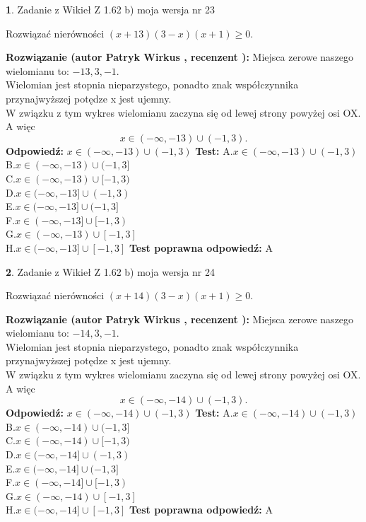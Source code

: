 \documentclass[12pt, a4paper]{article}
\theoremstyle{definition} %
\newtheorem{zad}{}
\newcommand{\zadStart}[1]{\begin{zad}#1\newline}
\newcommand{\zadStop}{\end{zad}}
\newcommand{\rozwStart}[2]{\noindent \textbf{Rozwiązanie (autor #1 , recenzent #2): }\newline}
\newcommand{\rozwStop}{\newline}
\newcommand{\odpStart}{\noindent \textbf{Odpowiedź:}\newline}
\newcommand{\odpStop}{\newline}
\newcommand{\testStart}{\noindent \textbf{Test:}\newline}
\newcommand{\testStop}{\newline}
\newcommand{\kluczStart}{\noindent \textbf{Test poprawna odpowiedź:}\newline}
\newcommand{\kluczStop}{\newline}
\begin{document}
\zadStart{Zadanie z Wikieł Z 1.62 b) moja wersja nr 23}

Rozwiązać nierówności $(x+13)(3-x)(x+1)\ge0$.
\zadStop
\rozwStart{Patryk Wirkus}{}
Miejsca zerowe naszego wielomianu to: $-13, 3, -1$.\\
Wielomian jest stopnia nieparzystego, ponadto znak współczynnika przy\linebreak najwyższej potędze x jest ujemny.\\ W związku z tym wykres wielomianu zaczyna się od lewej strony powyżej osi OX. A więc $$x \in (-\infty,-13) \cup (-1,3).$$
\rozwStop
\odpStart
$x \in (-\infty,-13) \cup (-1,3)$
\odpStop
\testStart
A.$x \in (-\infty,-13) \cup (-1,3)$\\
B.$x \in (-\infty,-13) \cup (-1,3]$\\
C.$x \in (-\infty,-13) \cup [-1,3)$\\
D.$x \in (-\infty,-13] \cup (-1,3)$\\
E.$x \in (-\infty,-13] \cup (-1,3]$\\
F.$x \in (-\infty,-13] \cup [-1,3)$\\
G.$x \in (-\infty,-13) \cup [-1,3]$\\
H.$x \in (-\infty,-13] \cup [-1,3]$
\testStop
\kluczStart
A
\kluczStop



\zadStart{Zadanie z Wikieł Z 1.62 b) moja wersja nr 24}

Rozwiązać nierówności $(x+14)(3-x)(x+1)\ge0$.
\zadStop
\rozwStart{Patryk Wirkus}{}
Miejsca zerowe naszego wielomianu to: $-14, 3, -1$.\\
Wielomian jest stopnia nieparzystego, ponadto znak współczynnika przy\linebreak najwyższej potędze x jest ujemny.\\ W związku z tym wykres wielomianu zaczyna się od lewej strony powyżej osi OX. A więc $$x \in (-\infty,-14) \cup (-1,3).$$
\rozwStop
\odpStart
$x \in (-\infty,-14) \cup (-1,3)$
\odpStop
\testStart
A.$x \in (-\infty,-14) \cup (-1,3)$\\
B.$x \in (-\infty,-14) \cup (-1,3]$\\
C.$x \in (-\infty,-14) \cup [-1,3)$\\
D.$x \in (-\infty,-14] \cup (-1,3)$\\
E.$x \in (-\infty,-14] \cup (-1,3]$\\
F.$x \in (-\infty,-14] \cup [-1,3)$\\
G.$x \in (-\infty,-14) \cup [-1,3]$\\
H.$x \in (-\infty,-14] \cup [-1,3]$
\testStop
\kluczStart
A
\kluczStop
\end{document}
